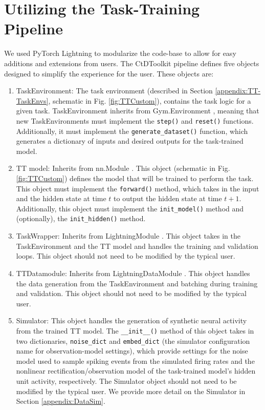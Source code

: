 \documentclass{article}
\begin{document}
\section{Utilizing the Task-Training Pipeline \label{appendix:TT}}
We used PyTorch Lightning to modularize the code-base to allow for easy additions and extensions from users. The CtDToolkit pipeline defines five objects designed to simplify the experience for the user. These objects are:
\begin{enumerate}
    \item TaskEnvironment: The task environment (described in Section \ref{appendix:TT-TaskEnvs}, schematic in Fig. \ref{fig:TTCustom}), contains the task logic for a given task. TaskEnvironment inherits from Gym.Environment \cite{towers_gymnasium_2023}, meaning that new TaskEnvironments must implement the \texttt{step()} and \texttt{reset()} functions. Additionally, it must implement the \texttt{generate\_dataset()} function, which generates a dictionary of inputs and desired outputs for the task-trained model.

    \item TT model: Inherits from nn.Module \cite{paszke_pytorch_2019}. This object (schematic in Fig. \ref{fig:TTCustom}) defines the model that will be trained to perform the task. This object must implement the \texttt{forward()} method, which takes in the input and the hidden state at time $t$ to output the hidden state at time $t+1$. Additionally, this object must implement the \texttt{init\_model()} method and (optionally), the \texttt{init\_hidden()} method.

    \item TaskWrapper: Inherits from LightningModule \cite{falcon_pytorch_2019}. This object takes in the TaskEnvironment and the TT model and handles the training and validation loops. This object should not need to be modified by the typical user.

    \item TTDatamodule: Inherits from LightningDataModule \cite{falcon_pytorch_2019}. This object handles the data generation from the TaskEnvironment and batching during training and validation. This object should not need to be modified by the typical user.

    \item Simulator: This object handles the generation of synthetic neural activity from the trained TT model. The \texttt{\_\_init\_\_()} method of this object takes in two dictionaries, \texttt{noise\_dict} and \texttt{embed\_dict} (the simulator configuration name for observation-model settings), which provide settings for the noise model used to sample spiking events from the simulated firing rates and the nonlinear rectification/observation model of the task-trained model's hidden unit activity, respectively. The Simulator object should not need to be modified by the typical user. We provide more detail on the Simulator in Section \ref{appendix:DataSim}.

\end{enumerate}
\end{document}
